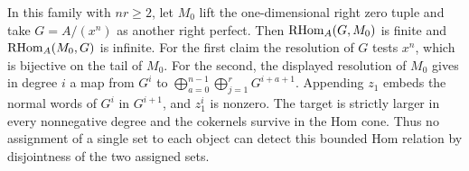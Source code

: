 \documentclass[11pt]{article}
\begin{document}
\begin{ex}
In this family with $nr\ge2$, let $M_0$ lift the one-dimensional right
zero tuple and take $G=A/(x^n)$ as another right perfect. Then
$\operatorname{RHom}_A(G,M_0)$ is finite and $\operatorname{RHom}_A(M_0,G)$ is infinite. For the
first claim the resolution of $G$ tests $x^n$, which is bijective on
the tail of $M_0$. For the second, the displayed resolution of $M_0$
gives in degree $i$ a map from $G^i$ to
$\bigoplus_{a=0}^{n-1}\bigoplus_{j=1}^r G^{i+a+1}$.
Appending $z_1$ embeds the normal words of $G^i$ in $G^{i+1}$,
and $z_1^i$ is nonzero. The target is strictly larger in every
nonnegative degree and the cokernels survive in the Hom cone.
Thus no assignment of a single set to each object can detect this
bounded Hom relation by disjointness of the two assigned sets.
\end{ex}
\end{document}
